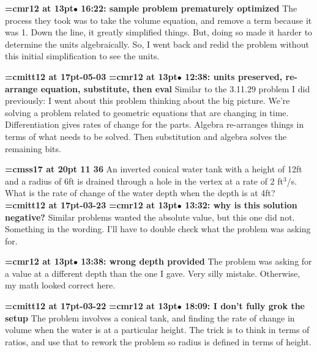{\smallskip\noindent\bf\font\titlefont=cmr12 at 13pt\titlefont $\bullet$ 16:22: sample problem prematurely optimized}\smallskip
The process they took was to take the volume equation, and remove a term because it was 1. Down the line, it greatly simplified things. But, doing so made it harder to determine the units algebraically. So, I went back and redid the problem without this initial simplification to see the units.
\par

{\medskip\noindent\bf\font\titlefont=cmitt12 at 17pt-05-03}\medskip
{\smallskip\noindent\bf\font\titlefont=cmr12 at 13pt\titlefont $\bullet$ 12:38: units preserved, re-arrange equation, substitute, then eval}\smallskip
Similar to the 3.11.29 problem I did previously: I went about this problem thinking about the big picture. We're solving a problem related to geometric equations that are changing in time. Differentiation gives rates of change for the parts. Algebra re-arranges things in terms of what needs to be solved. Then substitution and algebra solves the remaining bits.
\par

{\medskip\noindent\bf\font\titlefont=cmss17 at 20pt 11 36}\medskip
An inverted conical water tank with a height of 12ft and
a radius of 6ft is drained through a hole in the vertex
at a rate of 2 ft$^3$/s. What is the rate of change of the
water depth when the depth is at 4ft?
{\medskip\noindent\bf\font\titlefont=cmitt12 at 17pt-03-23}\medskip
{\smallskip\noindent\bf\font\titlefont=cmr12 at 13pt\titlefont $\bullet$ 13:32: why is this solution negative?}\smallskip
Similar problems wanted the absolute value, but this one did not. Something in the wording. I'll have to double check what the problem was asking for.
\par

{\smallskip\noindent\bf\font\titlefont=cmr12 at 13pt\titlefont $\bullet$ 13:38: wrong depth provided}\smallskip
The problem was asking for a value at a different depth than the one I gave. Very silly mistake. Otherwise, my math looked correct here.
\par

{\medskip\noindent\bf\font\titlefont=cmitt12 at 17pt-03-22}\medskip
{\smallskip\noindent\bf\font\titlefont=cmr12 at 13pt\titlefont $\bullet$ 18:09: I don't fully grok the setup}\smallskip
The problem involves a conical tank, and finding the rate of change in volume when the water is at a particular height. The trick is to think in terms of ratios, and use that to rework the problem so radius is defined in terms of height.
\par

